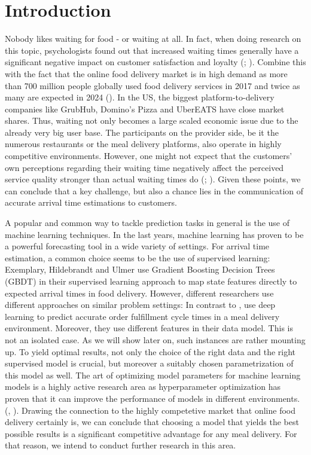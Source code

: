\chapter{Introduction}
Nobody likes waiting for food - or waiting at all. In fact, when doing research on this topic, psychologists found out that increased waiting times generally have a significant negative impact on customer satisfaction and loyalty (\citealt{WaitingTime1}; \citealt{WaitingTime2}). Combine this with the fact that the online food delivery market is in high demand as more than 700 million people globally used food delivery services in 2017 and twice as many are expected in 2024 (\citeauthor{Statista1}). In the US, the biggest platform-to-delivery companies like GrubHub, Domino's Pizza and UberEATS have close market shares. Thus, waiting not only becomes a large scaled economic issue due to the already very big user base. The participants on the provider side, be it the numerous restaurants or the meal delivery platforms, also operate in highly competitive environments. However, one might not expect that the customers’ own perceptions regarding their waiting time negatively affect the perceived service quality stronger than actual waiting times do (\citealt{waiting5}; \citealt{waiting6}). Given these points, we can conclude that a key challenge, but also a chance lies in the communication of accurate arrival time estimations to customers. 

A popular and common way to tackle prediction tasks in general is the use of machine learning techniques. In the last years, machine learning has proven to be a powerful forecasting tool in a wide variety of settings. For arrival time estimation, a common choice seems to be the use of supervised learning: Exemplary, Hildebrandt and Ulmer use Gradient Boosting Decision Trees (GBDT) in their supervised learning approach to map state features directly to expected arrival times in food delivery. However, different researchers use different approaches on similar problem settings: In contrast to \cite{Hildebrandt2020_EAT}, \cite{Zhu2020_OFCTE_DL} use deep learning to predict accurate order fulfillment cycle times in a meal delivery environment. Moreover, they use different features in their data model. This is not an isolated case. As we will show later on, such instances are rather mounting up. 
To yield optimal results, not only the choice of the right data and the right supervised model is crucial, but moreover a suitably chosen parametrization of this model as well. The art of optimizing model parameters for machine learning models is a highly active research area as hyperparameter optimization has proven that it can improve the performance of models in different environments. (\citealt{HPOMotivation}, \citealt{WU201926}).
Drawing the connection to the highly competetive market that online food delivery certainly is, we can conclude that choosing a model that yields the best possible results is a significant competitive advantage for any meal delivery. For that reason, we intend to conduct further research in this area.

